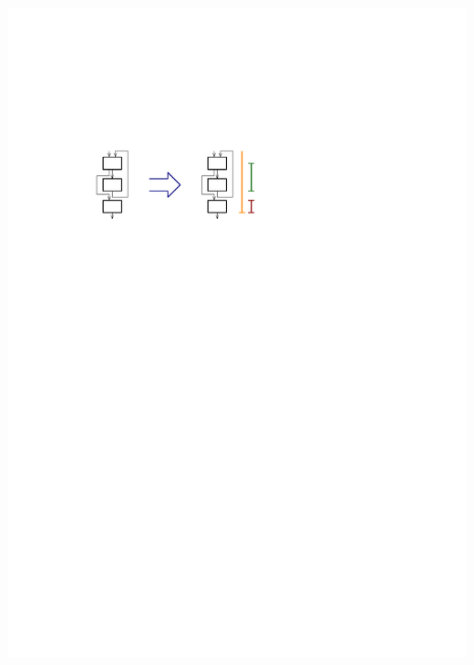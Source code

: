 \documentclass[navbaroff,en]{sdqbeamer}
\begin{document}
\begin{frame}
\begin{columns}
	\begin{column}{0.35\textwidth}
		\centering \includegraphics[scale=0.7]{images/lifetimes.pdf}
	\end{column}
\end{columns}
\end{frame}
\end{document}
